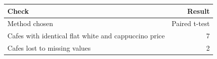 \begin{tabular}{lr}
\toprule
Check & Result \\
\midrule
Method chosen & Paired t-test \\
Cafes with identical flat white and cappuccino price & 7 \\
Cafes lost to missing values & 2 \\
\bottomrule
\end{tabular}
